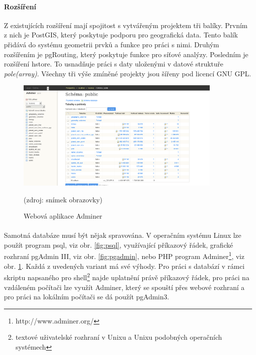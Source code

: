 \documentclass[11pt,a4paper,titlepage,oneside]{book}
\begin{document}
		\paragraph{Rozšíření}\label{par:rozsireni}Z existujících rozšíření mají spojitost s vytvářeným projektem tři balíky. Prvním z nich je PostGIS, který poskytuje podporu pro geografická data. Tento balík přidává do systému geometrii prvků a funkce pro práci s nimi. Druhým rozšířením je pgRouting, který poskytuje funkce pro síťové analýzy. Posledním je rozšíření hstore. To usnadňuje práci s daty uloženými v datové struktuře \textit{pole(array)}. Všechny tři výše zmíněné projekty jsou šířeny pod licencí GNU \ac{GPL}.
		\begin{figure}[!h]
			\begin{center}
				\includegraphics[width=10cm]{obrazky/adminer.png}
				\caption{Webová aplikace Adminer}
				\label{fig:adminer}
				(zdroj: snímek obrazovky)
			\end{center}
		\end{figure}			


		\paragraph{}Samotná databáze musí být nějak spravována. V operačním systému Linux lze použít program psql, viz obr. \ref{fig:psql}, využívající příkazový řádek, grafické rozhraní pgAdmin III, viz obr. \ref{fig:pgadmin}, nebo \ac{PHP} program Adminer\footnote{http://www.adminer.org/}, viz obr. \ref{fig:adminer}. Každá z uvedených variant má své výhody. Pro práci s databází v rámci skriptu napsaného pro shell\footnote{textové uživatelské rozhraní v Unixu a Unixu podobných operačních systémech} najde uplatnění právě příkazový řádek, pro práci na vzdáleném počítači lze využít Adminer, který se spouští přes webové rozhraní a pro práci na lokálním počítači se dá použít pgAdmin3.
\end{document}
